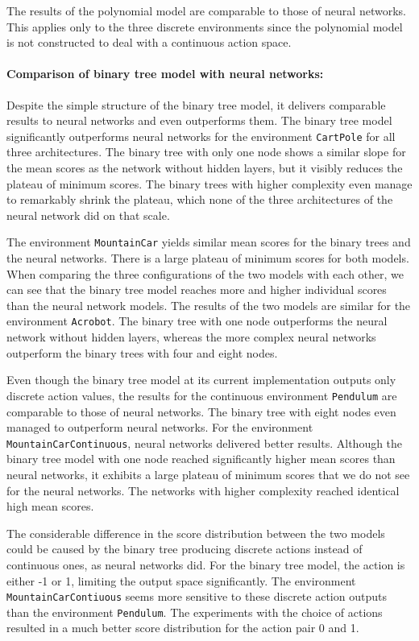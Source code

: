 The results of the polynomial model are comparable to those of neural networks. This applies only to the three discrete environments since the polynomial model is not constructed to deal with a continuous action space.

\paragraph*{Comparison of binary tree model with neural networks:} Despite the simple structure of the binary tree model, it delivers comparable results to neural networks and even outperforms them. The binary tree model significantly outperforms neural networks for the environment \verb|CartPole| for all three architectures. The binary tree with only one node shows a similar slope for the mean scores as the network without hidden layers, but it visibly reduces the plateau of minimum scores. The binary trees with higher complexity even manage to remarkably shrink the plateau, which none of the three architectures of the neural network did on that scale.

The environment \verb|MountainCar| yields similar mean scores for the binary trees and the neural networks. There is a large plateau of minimum scores for both models. When comparing the three configurations of the two models with each other, we can see that the binary tree model reaches more and higher individual scores than the neural network models. The results of the two models are similar for the environment \verb|Acrobot|. The binary tree with one node outperforms the neural network without hidden layers, whereas the more complex neural networks outperform the binary trees with four and eight nodes.

Even though the binary tree model at its current implementation outputs only discrete action values, the results for the continuous environment \verb|Pendulum| are comparable to those of neural networks. The binary tree with eight nodes even managed to outperform neural networks. For the environment \verb|MountainCarContinuous|, neural networks delivered better results. Although the binary tree model with one node reached significantly higher mean scores than neural networks, it exhibits a large plateau of minimum scores that we do not see for the neural networks. The networks with higher complexity reached identical high mean scores.

The considerable difference in the score distribution between the two models could be caused by the binary tree producing discrete actions instead of continuous ones, as neural networks did. For the binary tree model, the action is either -1 or 1, limiting the output space significantly. The environment \verb|MountainCarContiuous| seems more sensitive to these discrete action outputs than the environment \verb|Pendulum|. The experiments with the choice of actions resulted in a much better score distribution for the action pair 0 and 1.

